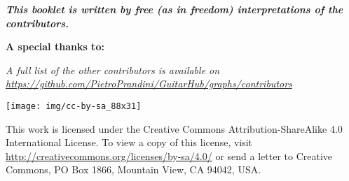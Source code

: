 \begin{center}
	{\textit{\textbf{This booklet is written by free (as in freedom) interpretations of the contributors.}}}\par
\end{center}
\begin{center}
	\textbf{A special thanks to:}
	
\end{center}
\begin{center}
	{\textit{\footnotesize{A full list of the other contributors is available on \href{https://github.com/PietroPrandini/GuitarHub/graphs/contributors}{https://github.com/PietroPrandini/GuitarHub/graphs/contributors}}}}\par
\end{center}
\begin{center}
	\texttt{[image: img/cc-by-sa\_88x31]} \par
	{\footnotesize{This work is licensed under the Creative Commons Attribution-ShareAlike 4.0 International License. To view a copy of this license, visit \href{http://creativecommons.org/licenses/by-sa/4.0/}{http://creativecommons.org/licenses/by-sa/4.0/} or send a letter to Creative Commons, PO Box 1866, Mountain View, CA 94042, USA.}}\par
\medskip
{}
\end{center}
\newpage
